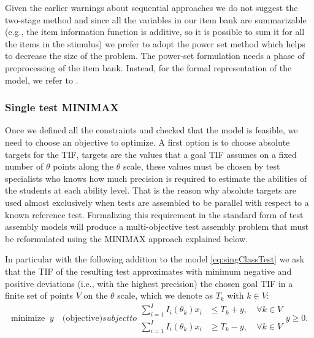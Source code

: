 Given the earlier warnings about sequential approaches we do not suggest the two-stage method and since all the variables in our item bank are summarizable (e.g., the item information function is additive, so it is possible to sum it for all the items in the stimulus) we prefer to adopt the power set method which helps to decrease the size of the problem.
The power-set formulation needs a phase of preprocessing of the item bank. Instead, for the formal representation of the model, we refer to \textcite[Section 7.2, ][]{VDL2005}.

\subsubsection{Single test MINIMAX}\label{sec:single-test-minimax}
Once we defined all the constraints and checked that the model is feasible, we need to choose an objective to optimize. A first option is to choose absolute targets for the TIF, targets are the values that a goal TIF assumes on a fixed number of $\theta$ points along the $\theta$ scale, these values must be chosen by test specialists who knows how much precision is required to estimate the abilities of the students at each ability level. That is the reason why absolute targets are used almost exclusively when tests are assembled to be parallel with respect to a known reference test. Formalizing this requirement in the standard form of test assembly models will produce a multi-objective test assembly problem that must be reformulated using the MINIMAX approach explained below.

In particular with the following addition to the model \eqref{eq:singClassTest} we ask that the TIF of the resulting test approximates with minimum negative and positive deviations (i.e., with the highest precision) the chosen goal TIF in a finite set of points $V$ on the $\theta$ scale, which we denote as $T_{k}$ with $k \in V$:
\begin{subequations}[intermezzo]
	\begin{equation}
	\mbox{minimize } \ y \quad \mbox{(objective)}
	\end{equation}
	subject to
	\begin{alignat}{2}
	\label{eq:SMINIMAX1}
	\sum_{i=1}^I I_i(\theta_{k}) x_{i} & \le T_{k}+ y, &\ \forall k \in V \\
	\label{eq:SMINIMAX2}
	\sum_{i=1}^I I_i(\theta_{k}) x_{i} & \ge T_{k}- y, &\ \forall k \in V
	\end{alignat}
	\begin{equation*}
	y \ge 0.
	\end{equation*}
	\label{eq:SMINIMAX}
\end{subequations}


